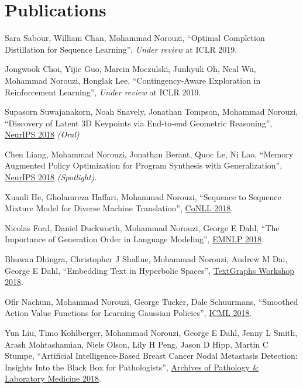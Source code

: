 \documentclass[10pt,letterpaper]{article}
\renewenvironment{itemize}{
  \begin{list}{}{
    \setlength{\leftmargin}{1.5em}
  }
}{
  \end{list}
}
\begin{document}
\section*{Publications}

\begin{itemize}

\item
Sara Sabour, William Chan, Mohammad Norouzi,
``Optimal Completion Distillation for Sequence Learning'',
{\em Under review} at ICLR 2019.

\item
Jongwook Choi, Yijie Guo, Marcin Moczulski, Junhyuk Oh, Neal Wu, Mohammad Norouzi, Honglak Lee,
``Contingency-Aware Exploration in Reinforcement Learning'',
{\em Under review} at ICLR 2019.


\item Supasorn Suwajanakorn, Noah Snavely, Jonathan Tompson, Mohammad Norouzi,
``Discovery of Latent 3D Keypoints via End-to-end Geometric Reasoning'',
\href{https://arxiv.org/pdf/1807.03146}{NeurIPS 2018} {\em (Oral)}

\item Chen Liang, Mohammad Norouzi, Jonathan Berant, Quoc Le, Ni Lao,
``Memory Augmented Policy Optimization for Program Synthesis with Generalization'',
\href{https://arxiv.org/pdf/1807.02322}{NeurIPS 2018} {\em (Spotlight)}.


\item Xuanli He, Gholamreza Haffari, Mohammad Norouzi,
``Sequence to Sequence Mixture Model for Diverse Machine Translation'',
\href{https://arxiv.org/pdf/1810.07391}{CoNLL 2018}.

\item Nicolas Ford, Daniel Duckworth, Mohammad Norouzi, George E Dahl,
``The Importance of Generation Order in Language Modeling'',
\href{https://arxiv.org/pdf/1808.07910}%
{EMNLP 2018}.

\item Bhuwan Dhingra, Christopher J Shallue, Mohammad Norouzi, Andrew M Dai, George E Dahl,
``Embedding Text in Hyperbolic Spaces'',
\href{https://arxiv.org/pdf/1806.04313.pdf}%
{TextGraphs Workshop 2018}.

\item Ofir Nachum, Mohammad Norouzi, George Tucker, Dale Schuurmans,
``Smoothed Action Value Functions for Learning Gaussian Policies'',
\href{https://arxiv.org/pdf/1803.02348}%
{ICML 2018}.

\item Yun Liu, Timo Kohlberger, Mohammad Norouzi, George E Dahl, Jenny L Smith, Arash Mohtashamian, Niels Olson, Lily H Peng, Jason D Hipp, Martin C Stumpe,
``Artificial Intelligence-Based Breast Cancer Nodal Metastasis Detection: Insights Into the Black Box for Pathologists'',
\href{http://www.archivesofpathology.org/doi/pdf/10.5858/arpa.2018-0147-OA}
{Archives of Pathology \& Laboratory Medicine 2018}.


\end{itemize}
\end{document}
